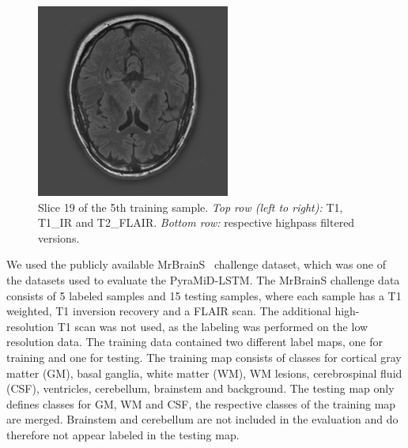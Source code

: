 \documentclass[runningheads,a4paper]{llncs}
\begin{document}
\begin{figure}
\begin{minipage}{.24\textwidth}
  \end{minipage}
  \begin{minipage}{.24\textwidth}
 \includegraphics[width=.99\linewidth]{./images/t2-flair-gs.png}
  \end{minipage}
  \caption{Slice 19 of the 5th training sample. \emph{Top row (left to right):} T1, T1\_IR and T2\_FLAIR. \emph{Bottom row:} respective highpass filtered versions.}
  \label{data}
\end{figure}
We used the publicly available MrBrainS~\cite{mendrik2015mrbrains} challenge dataset, which was one of the datasets used to evaluate the PyraMiD-LSTM. The MrBrainS challenge data consists of 5 labeled samples and 15 testing samples, where each sample has a T1 weighted, T1 inversion recovery and a FLAIR scan. The additional high-resolution T1 scan was not used, as the labeling was performed on the low resolution data. The training data contained two different label maps, one for training and one for testing. The training map consists of classes for cortical gray matter (GM), basal ganglia, white matter (WM), WM lesions, cerebrospinal fluid (CSF), ventricles, cerebellum, brainstem and background. The testing map only defines classes for GM, WM and CSF, the respective classes of the training map are merged. Brainstem and cerebellum are not included in the evaluation and do therefore not appear labeled in the testing map.
\end{document}
